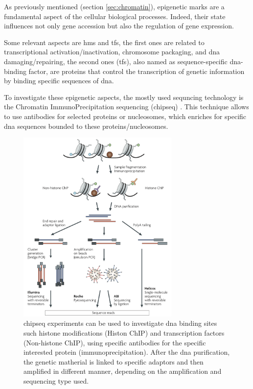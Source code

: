 As previously mentioned (section \ref{sec:chromatin}), epigenetic marks are a fundamental aspect of the cellular biological processes. 
Indeed, their state influences not only gene accession but also the regulation of gene expression.

Some relevant aspects are \glspl{hm} and \glspl{tf}, the first ones are related to transcriptional activation/inactivation, chromosome packaging, and \gls{dna} damaging/repairing, the second ones (\glspl{tf}), also named as sequence-specific \gls{dna}-binding factor, are proteins that control the transcription of genetic information by binding specific sequences of \gls{dna}.

To investigate these epigenetic aspects, the mostly used sequncing technology is the Chromatin ImmunoPrecipitation sequencing (\gls{chipseq}) \cite{Park2009}.
This technique allows to use antibodies for selected proteins or nucleosomes, which enriches for specific \gls{dna} sequences bounded to these proteins/nucleosomes.

\begin{figure}[H]
\centering
\includegraphics[width=8cm, keepaspectratio]{img/intro/chip.png}
\caption[\gls{chipseq} experiment]{\gls{chipseq} experiments can be used to investigate \gls{dna} binding sites such histone modifications (Histon ChIP) and transcription factors (Non-histone ChIP), using specific antibodies for the specific interested protein (immunoprecipitation).
After the \gls{dna} purification, the genetic matherial is linked to specific adaptors and then amplified in different manner, depending on the amplification and sequencing type used. \cite{Park2009}}
\label{fig:chipseqexp}
\end{figure}

